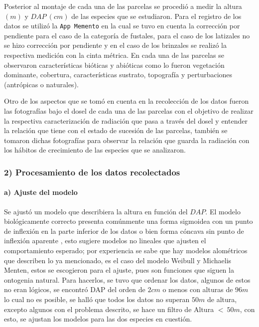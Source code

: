 \documentclass[letterpaper,9pt,twocolumn,twoside,]{pinp}
\begin{document}
Posterior al montaje de cada una de las parcelas se procedió a medir la
altura \((m)\) y \(DAP \ (cm)\) de las especies que se estudiaron. Para
el registro de los datos se utilizó la \texttt{App\ Memento} en la cual
se tuvo en cuenta la corrección por pendiente para el caso de la
categoría de fustales, para el caso de los latizales no se hizo
corrección por pendiente y en el caso de los brinzales se realizó la
respectiva medición con la cinta métrica. En cada una de las parcelas se
observaron características bióticas y abióticas como lo fueron
vegetación dominante, cobertura, características sustrato, topografía y
perturbaciones (antrópicas o naturales).

Otro de los aspectos que se tomó en cuenta en la recolección de los
datos fueron las fotografías bajo el dosel de cada una de las parcelas
con el objetivo de realizar la respectiva caracterización de radiación
que pasa a través del dosel y entender la relación que tiene con el
estado de sucesión de las parcelas, también se tomaron dichas
fotografías para observar la relación que guarda la radiación con los
hábitos de crecimiento de las especies que se analizaron.

\hypertarget{procesamiento-de-los-datos-recolectados}{%
\subsubsection{2) Procesamiento de los datos
recolectados}\label{procesamiento-de-los-datos-recolectados}}

\hypertarget{a-ajuste-del-modelo}{%
\paragraph{a) Ajuste del modelo}\label{a-ajuste-del-modelo}}

Se ajustó un modelo que describiera la altura en función del \(DAP\). El
modelo biológicamente correcto presenta comúnmente una forma sigmoidea
con un punto de inflexión en la parte inferior de los datos o bien forma
cóncava sin punto de inflexión aparente \citep{huan}, esto sugiere
modelos no lineales que ajusten el comportamiento esperado; por
experiencia se sabe que hay modelos alométricos que describen lo ya
mencionado, es el caso del modelo Weibull y Michaelis Menten, estos se
escogieron para el ajuste, pues son funciones que siguen la ontogenia
natural. Para hacerlos, se tuvo que ordenar los datos, algunos de estos
no eran lógicos, se encontró DAP del orden de \(2cm\) o menos con
alturas de \(96 m\) lo cual no es posible, se halló que todos los datos
no superan \(50 m\) de altura, excepto algunos con el problema descrito,
se hace un filtro de Altura \(< \ 50 m\), con esto, se ajustan los
modelos para las dos especies en cuestión.
\end{document}
